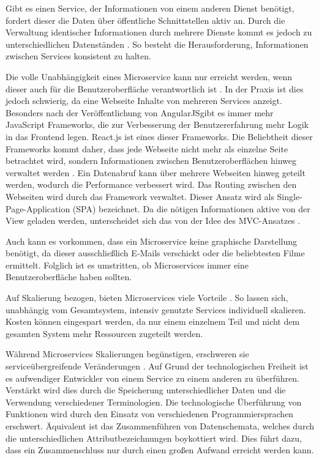 Gibt es einen Service, der Informationen von einem anderen Dienst benötigt, fordert dieser die Daten über öffentliche Schnittstellen aktiv an. Durch die Verwaltung identischer Informationen durch mehrere Dienste kommt es jedoch zu unterschiedlichen Datenständen \parencite[vgl.][Kap. 4.1]{wolff_microservices_2018}. So besteht die Herausforderung, Informationen zwischen Services konsistent zu halten.

Die volle Unabhängigkeit eines Microservice kann nur erreicht werden, wenn dieser auch für die Benutzeroberfläche verantwortlich ist \parencite[vgl.][Kap. 4.4]{wolff_microservices_2018}. In der Praxis ist dies jedoch schwierig, da eine Webseite Inhalte von mehreren Services anzeigt. Besonders nach der Veröffentlichung von AngularJS\footnotemark gibt es immer mehr JavaScript Frameworks, die zur Verbesserung der Benutzererfahrung mehr Logik in das Frontend legen. React.js ist eines dieser Frameworks.
Die Beliebtheit dieser Frameworks kommt daher, dass jede Webseite nicht mehr als einzelne Seite betrachtet wird, sondern Informationen zwischen Benutzeroberflächen hinweg verwaltet werden \parencite[vgl.][Kap. 9.1]{wolff_microservices_2018}. Ein Datenabruf kann über mehrere Webseiten hinweg geteilt werden, wodurch die Performance verbessert wird. Das Routing zwischen den Webseiten wird durch das Framework verwaltet. Dieser Ansatz wird als Single-Page-Application (SPA) bezeichnet. Da die nötigen Informationen aktive von der View geladen werden, unterscheidet sich das von der Idee des MVC-Ansatzes \parencite{single-page-webanwendung_2019}.


Auch kann es vorkommen, dass ein Microservice keine graphische Darstellung benötigt, da dieser ausschließlich E-Mails verschickt oder die beliebtesten Filme ermittelt. Folglich ist es umstritten, ob Microservices immer eine Benutzeroberfläche haben sollten.

Auf Skalierung bezogen, bieten Microservices viele Vorteile \parencite[vgl.][Kap. 2.1.4]{newman_monolith_2019}. So lassen sich, unabhängig vom Gesamtsystem, intensiv genutzte Services individuell skalieren. Kosten können eingespart werden, da nur einem einzelnem Teil und nicht dem gesamten System mehr Ressourcen zugeteilt werden.

Während Microservices Skalierungen begünstigen, erschweren sie serviceübergreifende Veränderungen \parencite[vgl.][Kap. 2.15]{newman_monolith_2019}. Auf Grund der technologischen Freiheit ist es aufwendiger Entwickler von einem Service zu einem anderen zu überführen. Verstärkt wird dies durch die Speicherung unterschiedlicher Daten und die Verwendung verschiedener Terminologien. Die technologische Überführung von Funktionen wird durch den Einsatz von verschiedenen Programmiersprachen erschwert. Äquivalent ist das Zusammenführen von Datenschemata, welches durch die unterschiedlichen Attributbezeichnungen boykottiert wird. Dies führt dazu, dass ein Zusammenschluss nur durch einen großen Aufwand erreicht werden kann.

